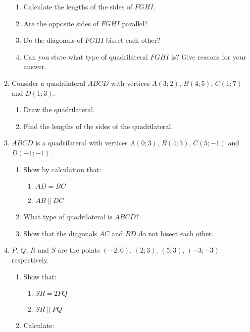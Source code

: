 \begin{eocexercises}{}
\begin{enumerate}[noitemsep, label=\textbf{\arabic*}. ]
    \begin{enumerate}[noitemsep, label=\textbf{(\alph*)} ]
    \item Calculate the lengths of the sides of $FGHI$.
    \item Are the opposite sides of $FGHI$ parallel?
    \item Do the diagonals of $FGHI$ bisect each other?
    \item Can you state what type of quadrilateral $FGHI$ is? Give reasons for your answer.
    \end{enumerate}
  \item Consider a quadrilateral $ABCD$ with vertices $A(3;2)$, $B(4;5)$, $C(1;7)$ and $D(1;3)$.
    \begin{enumerate}[noitemsep, label=\textbf{(\alph*)} ]
    \item  Draw the quadrilateral.
    \item  Find the lengths of the sides of the quadrilateral.
    \end{enumerate}
  \item $ABCD$ is a quadrilateral with vertices $A(0;3)$, $B(4;3)$, $C(5;-1)$ and $D(-1;-1)$.
    \begin{enumerate}[noitemsep, label=\textbf{(\alph*)} ]
    \item Show by calculation that:
      \begin{enumerate}[noitemsep, label=\textbf{\roman*}. ] 
      \item $AD = BC$
      \item $AB \parallel DC$
      \end{enumerate}
    \item What type of quadrilateral is $ABCD$?
    \item Show that the diagonals $AC$ and $BD$ do not bisect each other.
    \end{enumerate}
  \item $P$, $Q$, $R$ and $S$ are the points $(-2;0)$, $(2;3)$, $(5;3)$, $(-3;-3)$ respectively.
    \begin{enumerate}[noitemsep, label=\textbf{(\alph*)} ]
    \item Show that:
      \begin{enumerate}[noitemsep, label=\textbf{\roman*}. ] 
      \item $SR = 2PQ$
      \item $SR \parallel PQ$
      \end{enumerate}
    \item Calculate:
      \begin{enumerate}[noitemsep, label=\textbf{\roman*}. ] 

\end{enumerate}
\end{enumerate}
\end{enumerate}
\end{eocexercises}
